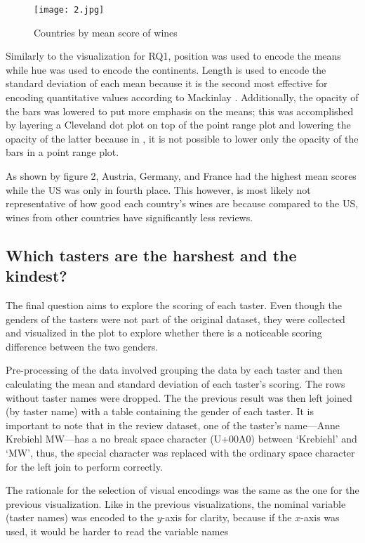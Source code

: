 \begin{figure}[h]
  \texttt{[image: 2.jpg]} 
  \caption{Countries by mean score of wines}
\end{figure}

Similarly to the visualization for RQ1, position was used to encode the means while hue was used to encode the continents. Length is used to encode the standard deviation of each mean because it is the second most effective for encoding quantitative values according to Mackinlay \cite{Mackinlay}. Additionally, the opacity of the bars was lowered to put more emphasis on the means; this was accomplished by layering a Cleveland dot plot on top of the point range plot and lowering the opacity of the latter because in , it is not possible to lower only the opacity of the bars in a point range plot.

As shown by figure 2, Austria, Germany, and France had the highest mean scores while the US was only in fourth place. This however, is most likely not representative of how good each country's wines are because compared to the US, wines from other countries have significantly less reviews.

\subsection{Which tasters are the harshest and the kindest?}
The final question aims to explore the scoring of each taster. Even though the genders of the tasters were not part of the original dataset, they were collected and visualized in the plot to explore whether there is a noticeable scoring difference between the two genders.

Pre-processing of the data involved grouping the data by each taster and then calculating the mean and standard deviation of each taster's scoring. The rows without taster names were dropped. The the previous result was then left joined (by taster name) with a table containing the gender of each taster. It is important to note that in the review dataset, one of the taster's name---Anne Krebiehl MW---has a no break space character (U+00A0) between `Krebiehl' and `MW', thus, the special character was replaced with the ordinary space character for the left join to perform correctly.

The rationale for the selection of visual encodings was the same as the one for the previous visualization. Like in the previous visualizations, the nominal variable (taster names) was encoded to the $y$-axis for clarity, because if the $x$-axis was used, it would be harder to read the variable names 

